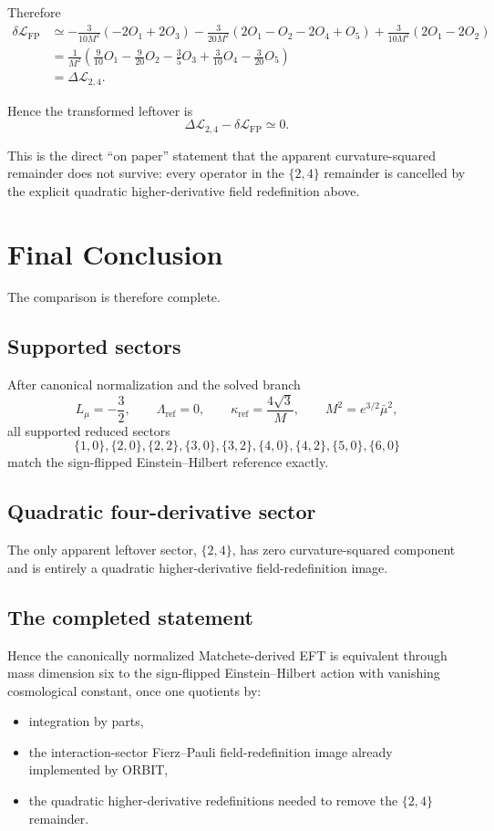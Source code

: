 \documentclass[11pt]{article}
\newcommand{\Lmu}{L_\mu}
\begin{document}
Therefore
\begin{align}
\delta\mathcal L_{\mathrm{FP}}
&\simeq
-\frac{3}{10M^2}(-2O_1+2O_3)
-\frac{3}{20M^2}(2O_1-O_2-2O_4+O_5)
+\frac{3}{10M^2}(2O_1-2O_2)\\
&=
\frac{1}{M^2}\left(
\frac{9}{10}O_1
-\frac{9}{20}O_2
-\frac35 O_3
+\frac{3}{10}O_4
-\frac{3}{20}O_5
\right)\\
&=
\Delta\mathcal L_{2,4}.
\end{align}

Hence the transformed leftover is
\begin{equation}
\Delta\mathcal L_{2,4}-\delta\mathcal L_{\mathrm{FP}} \simeq 0.
\end{equation}

This is the direct ``on paper'' statement that the apparent curvature-squared remainder does not survive: every operator in the $\{2,4\}$ remainder is cancelled by the explicit quadratic higher-derivative field redefinition above.

\section{Final Conclusion}

The comparison is therefore complete.

\subsection*{Supported sectors}
After canonical normalization and the solved branch
\[
\boxed{
\Lmu=-\frac32,\qquad
\Lambda_{\mathrm{ref}}=0,\qquad
\kappa_{\mathrm{ref}}=\frac{4\sqrt3}{M},
\qquad
M^2=e^{3/2}\bar\mu^2,}
\]
all supported reduced sectors
\[
\{1,0\},\{2,0\},\{2,2\},\{3,0\},\{3,2\},\{4,0\},\{4,2\},\{5,0\},\{6,0\}
\]
match the sign-flipped Einstein--Hilbert reference exactly.

\subsection*{Quadratic four-derivative sector}
The only apparent leftover sector, $\{2,4\}$, has zero curvature-squared component and is entirely a quadratic higher-derivative field-redefinition image.

\subsection*{The completed statement}
Hence the canonically normalized Matchete-derived EFT is equivalent through mass dimension six to the sign-flipped Einstein--Hilbert action with vanishing cosmological constant, once one quotients by:
\begin{itemize}
\item integration by parts,
\item the interaction-sector Fierz--Pauli field-redefinition image already implemented by ORBIT,
\item the quadratic higher-derivative redefinitions needed to remove the $\{2,4\}$ remainder.
\end{itemize}
\end{document}
